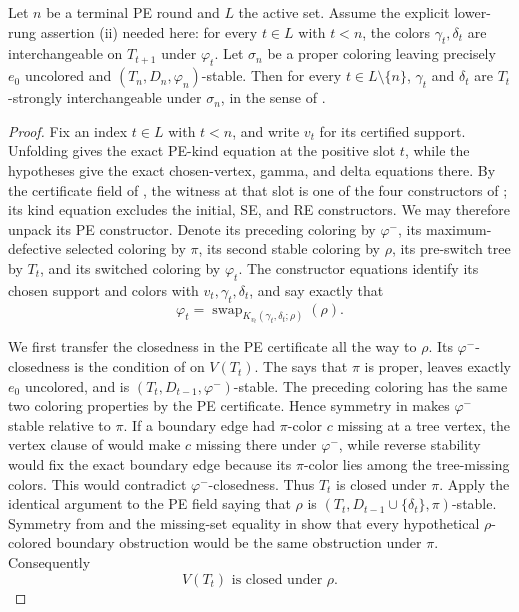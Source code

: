 \begin{lemma}
Let \(n\) be a terminal PE round and \(L\) the active set.  Assume the
explicit lower-rung assertion (ii) needed here: for every \(t\in L\) with
\(t<n\), the colors \(\gamma_t,\delta_t\) are interchangeable on
\(T_{t+1}\) under \(\varphi_t\).  Let \(\sigma_n\) be a proper coloring
leaving precisely \(e_0\) uncolored and
\((T_n,D_n,\varphi_n)\)-stable.  Then for every \(t\in L\setminus\{n\}\),
\(\gamma_t\) and \(\delta_t\) are \(T_t\)-strongly interchangeable under
\(\sigma_n\), in the sense of .
\end{lemma}
\begin{proof}
Fix an index \(t\in L\) with \(t<n\), and write \(v_t\) for its certified
support.  Unfolding  gives the exact
PE-kind equation at the positive slot \(t\), while the hypotheses give
the exact chosen-vertex, gamma, and delta equations there.  By the
certificate field of , the witness at that slot
is one of the four constructors of ; its
kind equation excludes the initial, SE, and RE constructors.  We may
therefore unpack its PE constructor.  Denote its preceding coloring by
\(\varphi^-\), its maximum-defective selected coloring by \(\pi\), its
second stable coloring by \(\rho\), its pre-switch tree by \(T_t\), and
its switched coloring by \(\varphi_t\).  The constructor equations
identify its chosen support and colors with
\(v_t,\gamma_t,\delta_t\), and say exactly that
\[
 \varphi_t=
 \operatorname{swap}_{K_{v_t}(\gamma_t,\delta_t;\rho)}(\rho).
 \tag{1}
\]

We first transfer the closedness in the PE certificate all the way to
\(\rho\).  Its \(\varphi^-\)-closedness is the condition of
 on \(V(T_t)\).  The
 says that \(\pi\) is proper, leaves
exactly \(e_0\) uncolored, and is
\((T_t,D_{t-1},\varphi^-)\)-stable.  The preceding coloring has the same
two coloring properties by the PE certificate.  Hence symmetry in
 makes \(\varphi^-\) stable relative to \(\pi\).  If a
boundary edge had \(\pi\)-color \(c\) missing at a tree vertex, the
vertex clause of  would make \(c\) missing there
under \(\varphi^-\), while reverse stability would fix the exact boundary
edge because its \(\pi\)-color lies among the tree-missing colors.  This
would contradict \(\varphi^-\)-closedness.  Thus \(T_t\) is closed under
\(\pi\).  Apply the identical argument to the PE field saying that
\(\rho\) is
\((T_t,D_{t-1}\cup\{\delta_t\},\pi)\)-stable.  Symmetry from
 and the missing-set equality in
 show that every hypothetical
\(\rho\)-colored boundary obstruction would be the same obstruction
under \(\pi\).  Consequently
\[
                 V(T_t)\text{ is closed under }\rho .            \tag{2}
\]


\end{proof}
